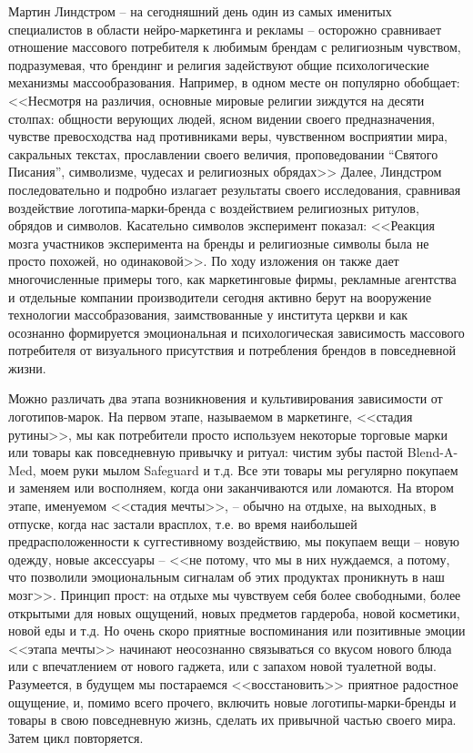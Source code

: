 Мартин Линдстром -- на сегодняшний день один из самых именитых специалистов в
области нейро-маркетинга и рекламы -- осторожно сравнивает отношение массового
потребителя к любимым брендам с религиозным чувством, подразумевая, что брендинг
и религия задействуют общие психологические механизмы массообразования. Например,
в одном месте он популярно обобщает: <<Несмотря на различия, основные мировые
религии зиждутся на десяти столпах: общности верующих людей, ясном видении
своего предназначения, чувстве превосходства над противниками веры,
чувственном восприятии мира, сакральных текстах, прославлении своего величия,
проповедовании ``Святого Писания'', символизме, чудесах и религиозных обрядах>>\autocite{lindstrom2010}
Далее, Линдстром последовательно и подробно излагает результаты своего исследования,
сравнивая воздействие логотипа-марки-бренда с воздействием религиозных ритулов,
обрядов и символов. Касательно символов эксперимент показал: <<Реакция мозга
участников эксперимента на бренды и религиозные символы была не просто похожей,
но одинаковой>>.\autocite{lindstrom2010} По ходу изложения он также дает
многочисленные примеры того, как маркетинговые фирмы, рекламные агентства
и отдельные компании производители сегодня активно берут на вооружение технологии массобразования,
заимствованные у института церкви и как осознанно формируется эмоциональная и
психологическая зависимость массового потребителя от визуального присутствия и
потребления брендов в повседневной жизни.

Можно различать два этапа возникновения и культивирования зависимости от логотипов-марок.
На первом этапе, называемом в маркетинге, <<стадия рутины>>, мы как потребители просто
используем некоторые торговые марки или товары как  повседневную привычку и ритуал:
чистим зубы пастой Blend-A-Med, моем руки мылом Safeguard и т.д. Все эти товары мы
регулярно покупаем и заменяем или восполняем, когда они заканчиваются или ломаются.
На втором этапе, именуемом <<стадия мечты>>, -- обычно на отдыхе, на выходных, в отпуске,
когда нас застали врасплох, т.е. во время наибольшей предрасположенности к
суггестивному воздействию, мы покупаем вещи -- новую одежду, новые аксессуары --
<<не потому, что мы в них нуждаемся, а потому, что позволили эмоциональным сигналам
об этих продуктах проникнуть в наш мозг>>.\autocite{lindstrom2011brandwashed}
Принцип прост: на отдыхе мы чувствуем себя более свободными, более открытыми для
новых ощущений, новых предметов гардероба, новой косметики, новой еды и т.д.
Но очень скоро приятные воспоминания или позитивные эмоции <<этапа мечты>>
начинают неосознанно связываться со вкусом нового блюда или с впечатлением
от нового гаджета, или с запахом новой туалетной воды. Разумеется, в будущем мы
постараемся <<восстановить>>  приятное радостное ощущение, и, помимо всего прочего,
включить новые логотипы-марки-бренды и товары в свою повседневную жизнь,
сделать их привычной частью своего мира. Затем цикл повторяется.

